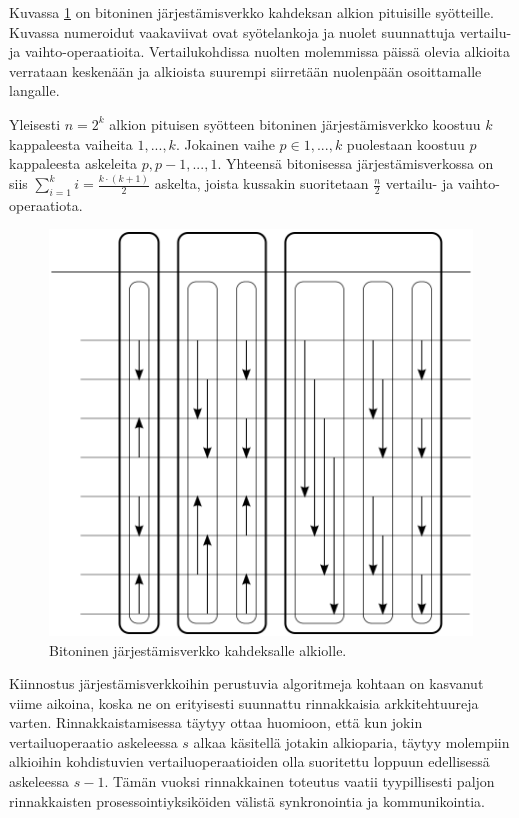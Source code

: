 \documentclass[a4paper,11pt]{article}
\begin{document}

Kuvassa \ref{fig:bitonicsort} on bitoninen järjestämisverkko kahdeksan alkion pituisille syötteille. Kuvassa numeroidut vaakaviivat ovat syötelankoja ja nuolet suunnattuja vertailu- ja vaihto-operaatioita. Vertailukohdissa nuolten molemmissa päissä olevia alkioita verrataan keskenään ja alkioista suurempi siirretään nuolenpään osoittamalle langalle.

Yleisesti $n = 2^k$ alkion pituisen syötteen bitoninen järjestämisverkko koostuu $k$ kappaleesta vaiheita $1,...,k$. Jokainen vaihe $p \in 1,...,k$ puolestaan koostuu $p$ kappaleesta askeleita $p, p-1, ..., 1$. Yhteensä bitonisessa järjestämisverkossa on siis $\sum_{i = 1}^k i = \frac{k \cdot (k + 1)}{2}$ askelta, joista kussakin suoritetaan $\frac{n}{2}$ vertailu- ja vaihto-o\-pe\-raa\-ti\-o\-ta.

\begin{figure}
\centering
\includegraphics[scale = 0.8]{bitonic}
\caption{Bitoninen järjestämisverkko kahdeksalle alkiolle.}
\label{fig:bitonicsort}
\end{figure}

Kiinnostus järjestämisverkkoihin perustuvia algoritmeja kohtaan on kasvanut viime aikoina, koska ne on erityisesti suunnattu rinnakkaisia arkkitehtuureja varten. Rinnakkaistamisessa täytyy ottaa huomioon, että kun jokin vertailuoperaatio askeleessa $s$ alkaa käsitellä jotakin alkioparia, täytyy molempiin alkioihin kohdistuvien vertailuoperaatioiden olla suoritettu loppuun edellisessä askeleessa $s - 1$. Tämän vuoksi rinnakkainen toteutus vaatii tyypillisesti paljon rinnakkaisten prosessointiyksiköiden välistä synkronointia ja kommunikointia.
\end{document}
